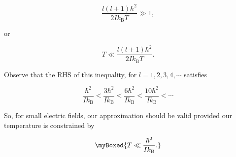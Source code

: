 {\begin{equation}\label{eqn:basicStatMechProblemSet5Problem3:640}
\frac{l(l+1) \hbar^2}{2 I k_{\mathrm{B}} T} \gg 1,
\end{equation}

or

\begin{equation}\label{eqn:basicStatMechProblemSet5Problem3:660}
T \ll \frac{l(l+1) \hbar^2}{2 I k_{\mathrm{B}} T}.
\end{equation}

Observe that the RHS of this inequality, for $l = 1, 2, 3, 4, \cdots$ satisfies

\begin{equation}\label{eqn:basicStatMechProblemSet5Problem3:680}
\frac{\hbar^2 }{I k_{\mathrm{B}}}
<
\frac{3 \hbar^2 }{I k_{\mathrm{B}}}
<
\frac{6 \hbar^2 }{I k_{\mathrm{B}}}
<
\frac{10 \hbar^2 }{I k_{\mathrm{B}}}
< \cdots
\end{equation}

So, for small electric fields, our approximation should be valid provided our temperature is constrained by

\begin{equation}\label{eqn:basicStatMechProblemSet5Problem3:700}
\myBoxed{
T \ll \frac{\hbar^2 }{I k_{\mathrm{B}}}.
}
\end{equation}
}

